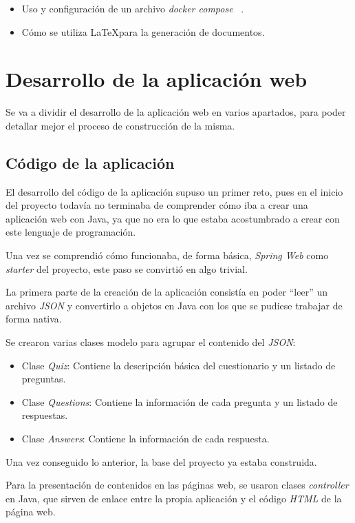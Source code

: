 \begin{itemize}
	\item Uso y configuración de un archivo \textit{docker compose} ~\cite{web:dockercompose}.
	\item Cómo se utiliza \LaTeX para la generación de documentos.
\end{itemize}

\section{Desarrollo de la aplicación web}

Se va a dividir el desarrollo de la aplicación web en varios apartados, para poder detallar mejor el proceso de construcción de la misma.

\subsection{Código de la aplicación}

El desarrollo del código de la aplicación supuso un primer reto, pues en el inicio del proyecto todavía no terminaba de comprender cómo iba a crear una aplicación web con Java, ya que no era lo que estaba acostumbrado a crear con este lenguaje de programación.

Una vez se comprendió cómo funcionaba, de forma básica, \textit{Spring Web} como \textit{starter} del proyecto, este paso se convirtió en algo trivial.

La primera parte de la creación de la aplicación consistía en poder ``leer'' un archivo \textit{JSON} y convertirlo a objetos en Java con los que se pudiese trabajar de forma nativa.

Se crearon varias clases modelo para agrupar el contenido del \textit{JSON}:

 \begin{itemize}
	\item Clase \textit{Quiz}: Contiene la descripción básica del cuestionario y un listado de preguntas.
	\item Clase \textit{Questions}: Contiene la información de cada pregunta y un listado de respuestas.
	\item Clase \textit{Answers}: Contiene la información de cada respuesta.
\end{itemize}

Una vez conseguido lo anterior, la base del proyecto ya estaba construida.

Para la presentación de contenidos en las páginas web, se usaron clases \textit{controller} en Java, que sirven de enlace entre la propia aplicación y el código \textit{HTML} de la página web.

